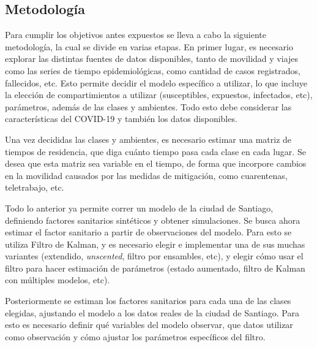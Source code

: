 \begin{intro}


 

\section*{Metodología}

Para cumplir los objetivos antes expuestos se lleva a cabo la siguiente metodología, la cual se divide en varias etapas. En primer lugar, es necesario explorar las distintas fuentes de datos disponibles, tanto de movilidad y viajes como las series de tiempo epidemiológicas, como cantidad de casos registrados, fallecidos, etc. Esto permite decidir el modelo específico a utilizar, lo que incluye la elección de compartimientos a utilizar (susceptibles, expuestos, infectados, etc), parámetros, además de las clases y ambientes. Todo esto debe considerar las características del COVID-19 y también los datos disponibles. 

Una vez decididas las clases y ambientes, es necesario estimar una matriz de tiempos de residencia, que diga cuánto tiempo pasa cada clase en cada lugar. Se desea que esta matriz sea variable en el tiempo, de forma que incorpore cambios en la movilidad causados por las medidas de mitigación, como cuarentenas, teletrabajo, etc.

Todo lo anterior ya permite correr un modelo de la ciudad de Santiago, definiendo factores sanitarios sintéticos y obtener simulaciones. Se busca ahora estimar el factor sanitario a partir de observaciones del modelo. Para esto se utiliza Filtro de Kalman, y es necesario elegir e implementar una de sus muchas variantes (extendido, \textit{unscented}, filtro por ensambles, etc), y elegir cómo usar el filtro para hacer estimación de parámetros (estado aumentado, filtro de Kalman con múltiples modelos, etc).

Posteriormente se estiman los factores sanitarios para cada una de las clases elegidas, ajustando el modelo a los datos reales de la ciudad de Santiago. Para esto es necesario definir qué variables del modelo observar, que datos utilizar como observación y cómo ajustar los parámetros específicos del filtro.


\end{intro}
